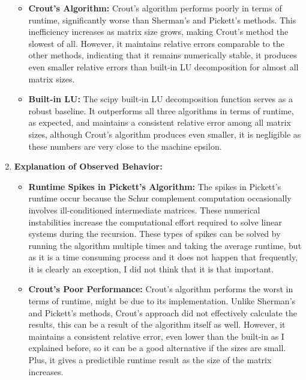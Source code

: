 \documentclass[11pt,a4paper, margin=1in]{article}
\begin{document}
\begin{enumerate}
\begin{itemize}
        \item \textbf{Crout's Algorithm:} 
        Crout's algorithm performs poorly in terms of runtime, significantly worse than Sherman's and Pickett's methods. This inefficiency increases as matrix size grows, making Crout's method the slowest of all. However, it maintains relative errors comparable to the other methods, indicating that it remains numerically stable, it produces even smaller relative errors than built-in LU decomposition for almost all matrix sizes.
        
        \item \textbf{Built-in LU:} 
        The scipy built-in LU decomposition function serves as a robust baseline. It outperforms all three algorithms in terms of runtime, as expected, and maintains a consistent relative error among all matrix sizes, although Crout's algorithm produces even smaller, it is negligible as these numbers are very close to the machine epsilon.
    \end{itemize}
    
    \newpage

    \item \textbf{Explanation of Observed Behavior:}
    
    \begin{itemize}
        \item \textbf{Runtime Spikes in Pickett's Algorithm:}
        The spikes in Pickett's runtime occur because the Schur complement computation occasionally involves ill-conditioned intermediate matrices. These numerical instabilities increase the computational effort required to solve linear systems during the recursion. These types of spikes can be solved by running the algorithm multiple times and taking the average runtime, but as it is a time consuming process and it does not happen that frequently, it is clearly an exception, I did not think that it is that important.

        \item \textbf{Crout's Poor Performance:}
        Crout's algorithm performs the worst in terms of runtime, might be due to its implementation. Unlike Sherman's and Pickett's methods, Crout's approach did not effectively calculate the results, this can be a result of the algorithm itself as well. However, it maintains a consistent relative error, even lower than the built-in as I explained before, so it can be a good alternative if the sizes are small. Plus, it gives a predictible runtime result as the size of the matrix increases.


\end{itemize}
\end{enumerate}
\end{document}

